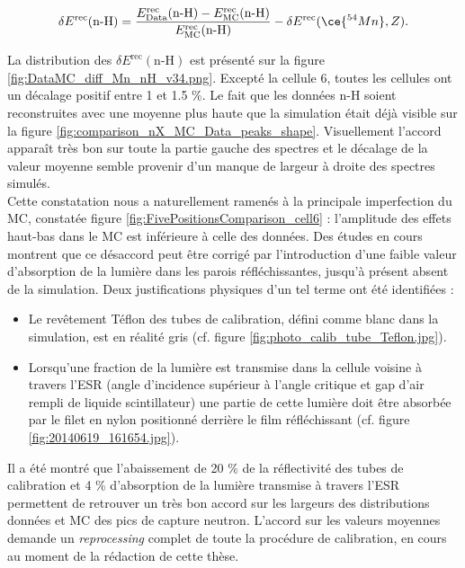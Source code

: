 \begin{equation}
    \delta E^\textrm{rec} (\textrm{n-H}) = \frac{E^\textrm{rec}_\textrm{Data} (\textrm{n-H}) - E^\textrm{rec}_\textrm{MC} (\textrm{n-H})}{E^\textrm{rec}_\textrm{MC} (\textrm{n-H})} - \delta E^\textrm{rec} (\ce{^{54}Mn}, Z).
\end{equation}

\bigbreak

La distribution des $\delta E^\textrm{rec} (\textrm{n-H})$ est présenté sur la figure \ref{fig:DataMC_diff_Mn_nH_v34.png}. Excepté la cellule 6, toutes les cellules ont un décalage positif entre 1 et 1.5 \%. Le fait que les données n-H soient reconstruites avec une moyenne plus haute que la simulation était déjà visible sur la figure \ref{fig:comparison_nX_MC_Data_peaks_shape}. Visuellement l'accord apparaît très bon sur toute la partie gauche des spectres et le décalage de la valeur moyenne semble provenir d'un manque de largeur à droite des spectres simulés.\\

Cette constatation nous a naturellement ramenés à la principale imperfection du MC, constatée figure \ref{fig:FivePositionsComparison_cell6} : l'amplitude des effets haut-bas dans le MC est inférieure à celle des données. Des études en cours montrent que ce désaccord peut être corrigé par l'introduction d'une faible valeur d'absorption de la lumière dans les parois réfléchissantes, jusqu'à présent absent de la simulation. Deux justifications physiques d'un tel terme ont été identifiées :

\begin{itemize}[label=\textbullet]
    \item Le revêtement Téflon des tubes de calibration, défini comme blanc dans la simulation, est en réalité gris (cf. figure \ref{fig:photo_calib_tube_Teflon.jpg}).
    \item Lorsqu'une fraction de la lumière est transmise dans la cellule voisine à travers l'ESR (angle d'incidence supérieur à l'angle critique et gap d'air rempli de liquide scintillateur) une partie de cette lumière doit être absorbée par le filet en nylon positionné derrière le film réfléchissant (cf. figure \ref{fig:20140619_161654.jpg}).
\end{itemize}

\bigbreak

Il a été montré que l'abaissement de 20 \% de la réflectivité des tubes de calibration et 4 \% d'absorption de la lumière transmise à travers l'ESR permettent de retrouver un très bon accord sur les largeurs des distributions données et MC des pics de capture neutron. L'accord sur les valeurs moyennes demande un \textit{reprocessing} complet de toute la procédure de calibration, en cours au moment de la rédaction de cette thèse.


